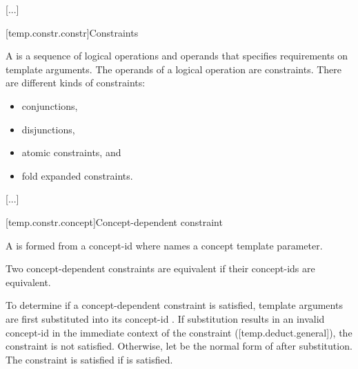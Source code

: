 \documentclass{wg21}
\begin{document}
\textcolor{noteclr}{[...]}

[temp.constr.constr]{Constraints}

\pnum
A  is a sequence of logical operations and
operands that specifies requirements on template arguments.
The operands of a logical operation are constraints.
There are  different kinds of constraints:
\begin{itemize}
    \item conjunctions,
    \item disjunctions,
    \item atomic constraints, and
    \item fold expanded constraints.
\end{itemize}

\textcolor{noteclr}{[...]}



\begin{addedblock}


[temp.constr.concept]{Concept-dependent constraint}

A  is formed from a concept-id 
where  names a concept template parameter.

Two concept-dependent constraints are equivalent if their concept-ids are equivalent.


To determine if a concept-dependent constraint is satisfied, template arguments are first substituted into its
concept-id . If substitution results in an invalid concept-id in the immediate context of the constraint ([temp.deduct.general]), the constraint is not satisfied.
Otherwise, let  be the normal form of  after substitution.
The constraint is satisfied if  is satisfied.



\end{addedblock}
\end{document}
